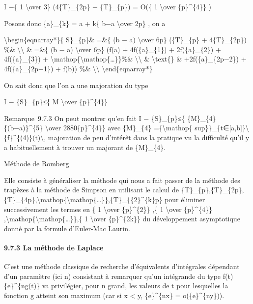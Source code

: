 \documentclass[]{article}
\begin{document}
I −\{ 1 \textbackslash{}over 3\} (4\{T\}\_\{2p\} − \{T\}\_\{p\}) = O(\{
1 \textbackslash{}over \{p\}\^{}\{4\}\} )

Posons donc \{a\}\_\{k\} = a + k\{ b−a \textbackslash{}over 2p\} , on a

\textbackslash{}begin\{eqnarray*\}\{ S\}\_\{p\}\& =\&\{ (b − a)
\textbackslash{}over 6p\} (\{T\}\_\{p\} + 4\{T\}\_\{2p\}) \%\&
\textbackslash{}\textbackslash{} \& =\&\{ (b − a) \textbackslash{}over
6p\} (f(a) + 4f(\{a\}\_\{1\}) + 2f(\{a\}\_\{2\}) + 4f(\{a\}\_\{3\}) +
\textbackslash{}mathop\{\textbackslash{}mathop\{\ldots{}\}\}\%\&
\textbackslash{}\textbackslash{} \& \textbackslash{}text\{\} \&
+2f(\{a\}\_\{2p−2\}) + 4f(\{a\}\_\{2p−1\}) + f(b)) \%\&
\textbackslash{}\textbackslash{} \textbackslash{}end\{eqnarray*\}

On sait donc que l'on a une majoration du type

\textbar{}I − \{S\}\_\{p\}\textbar{}≤\{ M \textbackslash{}over
\{p\}\^{}\{4\}\}

Remarque~9.7.3 On peut montrer qu'en fait \textbar{}I −
\{S\}\_\{p\}\textbar{}≤\{ \{M\}\_\{4\}\{(b−a)\}\^{}\{5\}
\textbackslash{}over 2880\{p\}\^{}\{4\}\} avec \{M\}\_\{4\}
=\{\textbackslash{}mathop\{
sup\}\}\_\{t∈{[}a,b{]}\}\textbackslash{}\textbar{}\{f\}\^{}\{(4)\}(t)\textbackslash{}\textbar{},
majoration de peu d'intérêt dans la pratique vu la difficulté qu'il y a
habituellement à trouver un majorant de \{M\}\_\{4\}.

Méthode de Romberg

Elle consiste à généraliser la méthode qui nous a fait passer de la
méthode des trapèzes à la méthode de Simpson en utilisant le calcul de
\{T\}\_\{p\},\{T\}\_\{2p\},\{T\}\_\{4p\},\textbackslash{}mathop\{\textbackslash{}mathop\{\ldots{}\}\},\{T\}\_\{\{2\}\^{}\{k\}p\}
pour éliminer successivement les termes en \{ 1 \textbackslash{}over
\{p\}\^{}\{2\}\} ,\{ 1 \textbackslash{}over \{p\}\^{}\{4\}\}
,\textbackslash{}mathop\{\textbackslash{}mathop\{\ldots{}\}\},\{ 1
\textbackslash{}over \{p\}\^{}\{2k\}\} du développement asymptotique
donné par la formule d'Euler-Mac Laurin.

\paragraph{9.7.3 La méthode de Laplace}

C'est une méthode classique de recherche d'équivalents d'intégrales
dépendant d'un paramètre (ici n) consistant à remarquer qu'un intégrande
du type f(t)\{e\}\^{}\{ng(t)\} va privilégier, pour n grand, les valeurs
de t pour lesquelles la fonction g atteint son maximum (car si x
\textless{} y, \{e\}\^{}\{nx\} = o(\{e\}\^{}\{ny\})).
\end{document}
